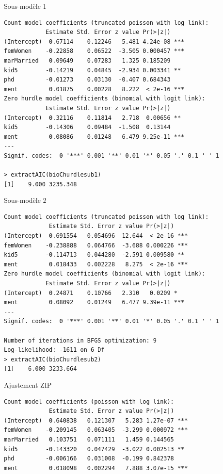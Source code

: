 \documentclass{BeamerTemplate}
\begin{document}
\begin{refsection}
\begin{frame}[fragile]{Sous-modèle 1}

{\scriptsize
\begin{verbatim}
Count model coefficients (truncated poisson with log link):
            Estimate Std. Error z value Pr(>|z|)    
(Intercept)  0.67114    0.12246   5.481 4.24e-08 ***
femWomen    -0.22858    0.06522  -3.505 0.000457 ***
marMarried   0.09649    0.07283   1.325 0.185209    
kid5        -0.14219    0.04845  -2.934 0.003341 ** 
phd         -0.01273    0.03130  -0.407 0.684343    
ment         0.01875    0.00228   8.222  < 2e-16 ***
Zero hurdle model coefficients (binomial with logit link):
            Estimate Std. Error z value Pr(>|z|)    
(Intercept)  0.32116    0.11814   2.718  0.00656 ** 
kid5        -0.14306    0.09484  -1.508  0.13144    
ment         0.08086    0.01248   6.479 9.25e-11 ***
---
Signif. codes:  0 '***' 0.001 '**' 0.01 '*' 0.05 '.' 0.1 ' ' 1 

> extractAIC(bioChurdlesub1)
[1]    9.000 3235.348
\end{verbatim}
}

\end{frame}

\begin{frame}[fragile]{Sous-modèle 2}
{\scriptsize
\begin{verbatim}
Count model coefficients (truncated poisson with log link):
             Estimate Std. Error z value Pr(>|z|)    
(Intercept)  0.691554   0.054696  12.644  < 2e-16 ***
femWomen    -0.238888   0.064766  -3.688 0.000226 ***
kid5        -0.114713   0.044280  -2.591 0.009580 ** 
ment         0.018433   0.002228   8.275  < 2e-16 ***
Zero hurdle model coefficients (binomial with logit link):
            Estimate Std. Error z value Pr(>|z|)    
(Intercept)  0.24871    0.10766   2.310   0.0209 *  
ment         0.08092    0.01249   6.477 9.39e-11 ***
---
Signif. codes:  0 '***' 0.001 '**' 0.01 '*' 0.05 '.' 0.1 ' ' 1 

Number of iterations in BFGS optimization: 9 
Log-likelihood: -1611 on 6 Df
> extractAIC(bioChurdlesub2)
[1]    6.000 3233.664
\end{verbatim}
}
\end{frame}

\begin{frame}[fragile]{Ajustement ZIP}
{\scriptsize
\begin{verbatim}
Count model coefficients (poisson with log link):
             Estimate Std. Error z value Pr(>|z|)    
(Intercept)  0.640838   0.121307   5.283 1.27e-07 ***
femWomen    -0.209145   0.063405  -3.299 0.000972 ***
marMarried   0.103751   0.071111   1.459 0.144565    
kid5        -0.143320   0.047429  -3.022 0.002513 ** 
phd         -0.006166   0.031008  -0.199 0.842378    
ment         0.018098   0.002294   7.888 3.07e-15 ***


\end{verbatim}}
\end{frame}
\end{refsection}
\end{document}
